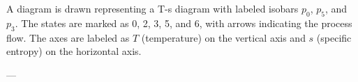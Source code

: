 A diagram is drawn representing a T-s diagram with labeled isobars \( p_0 \), \( p_5 \), and \( p_3 \). The states are marked as 0, 2, 3, 5, and 6, with arrows indicating the process flow. The axes are labeled as \( T \) (temperature) on the vertical axis and \( s \) (specific entropy) on the horizontal axis.

---